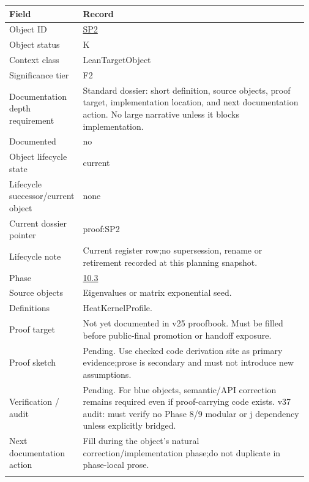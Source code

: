 \begin{longtable}{L{0.16\linewidth} L{0.81\linewidth}}
\hline
\textbf{Field} & \textbf{Record}\\
\hline
Object ID & \hyperlink{object-row-SP2}{SP2}\\
\hline\addlinespace[0.20em]
Object status & K\\
\hline\addlinespace[0.20em]
Context class & LeanTargetObject\\
\hline\addlinespace[0.20em]
Significance tier & F2\\
\hline\addlinespace[0.20em]
Documentation depth requirement & Standard dossier: short definition, source objects, proof target, implementation location, and next documentation action. No large narrative unless it blocks implementation.\\
\hline\addlinespace[0.20em]
Documented & no\\
\hline\addlinespace[0.20em]
Object lifecycle state & current\\
\hline\addlinespace[0.20em]
Lifecycle successor/\allowbreak{}current object & none\\
\hline\addlinespace[0.20em]
Current dossier pointer & proof:SP2\\
\hline\addlinespace[0.20em]
Lifecycle note & Current register row;\newline no supersession, rename or retirement recorded at this planning snapshot.\\
\hline\addlinespace[0.20em]
Phase & \hyperlink{phase-row-10-3}{10.3}\\
\hline\addlinespace[0.20em]
Source objects & Eigenvalues or matrix exponential seed.\\
\hline\addlinespace[0.20em]
Definitions & HeatKernelProfile.\\
\hline\addlinespace[0.20em]
Proof target & Not yet documented in v25 proofbook. Must be filled before public-final promotion or handoff exposure.\\
\hline\addlinespace[0.20em]
Proof sketch & Pending. Use checked code derivation site as primary evidence;\newline prose is secondary and must not introduce new assumptions.\\
\hline\addlinespace[0.20em]
Verification /\allowbreak{} audit & Pending. For blue objects, semantic/\allowbreak{}API correction remains required even if proof-carrying code exists. v37 audit: must verify no Phase 8/\allowbreak{}9 modular or j dependency unless explicitly bridged.\\
\hline\addlinespace[0.20em]
Next documentation action & Fill during the object's natural correction/\allowbreak{}implementation phase;\newline do not duplicate in phase-local prose.\\
\hline\addlinespace[0.20em]
\end{longtable}
